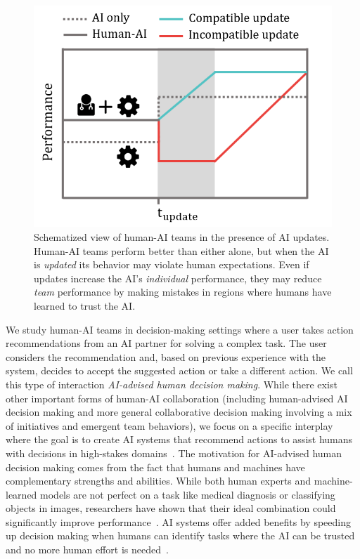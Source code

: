 \documentclass[letterpaper]{article}
\begin{document}
\begin{figure}[t]
    \begin{center}
    \includegraphics[width=\linewidth]{Picture1v2.png}
    \end{center}
    \caption{Schematized view of human-AI teams in the presence of AI updates. Human-AI teams perform better than either alone, but when the AI is {\em updated} its behavior may violate human expectations. Even if updates increase the AI's {\em individual} performance, they may reduce {\em team} performance by making mistakes in regions where humans have learned to trust the AI.}
    \label{fig:landing}
\end{figure}

We study human-AI teams in decision-making settings where a user takes action recommendations from an AI partner for solving a complex task. The user considers the recommendation and, based on previous experience with the system, decides to accept the suggested action or take a different action. We call this type of interaction {\em AI-advised human decision making}. While there exist other important forms of human-AI collaboration (including human-advised AI decision making and more general collaborative decision making involving a mix of initiatives and emergent team behaviors), we focus on a specific interplay where the goal is to create AI systems that recommend actions to assist humans with decisions in high-stakes domains~\cite{angwin2016machine,bayati2014data}. The motivation for AI-advised human decision making comes from the fact that humans and machines have complementary strengths and abilities. While both human experts and machine-learned models are not perfect on a task like medical diagnosis or classifying objects in images, researchers have shown that their ideal combination could significantly improve performance~\cite{wang2016deep,kamar2012combining}. 
AI systems offer added benefits by speeding up decision making when humans can identify tasks where the AI can be trusted and no more human effort is needed~\cite{lasecki2012scribe,lasecki2012real}. 
\end{document}
